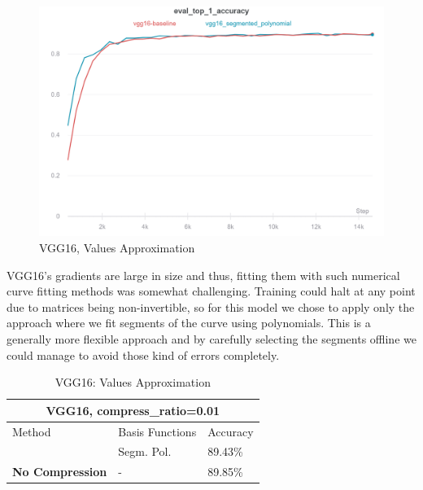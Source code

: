 
    
    \begin{figure}[h]
    \centering
    \includegraphics[width=1\textwidth]{thesis/figures/vgg-values-approx.png}
    \caption{VGG16, Values Approximation}
    \label{vgg_val_approx}
    \end{figure}

    \vspace{2cm}
    \newline
    VGG16's gradients are large in size and thus, fitting them with such numerical curve fitting methods was somewhat challenging.
    Training could halt at any point due to matrices being non-invertible, so for this model we chose to apply only the approach where we fit segments of the curve using polynomials. 
    This is a generally more flexible approach and by carefully selecting the segments offline we could manage to avoid those kind of errors completely.
    
    
    \vspace{1cm}

    \begin{table}[h!]
    \footnotesize
     \centering
    \begin{tabular}{ |p{3cm}||p{3cm}|p{1.5cm}|}
    \hline
    \multicolumn{3}{|c|}{\textbf{\footnotesize VGG16, compress\_ratio=0.01}} \\
    \hline
    \rule{0pt}{3ex}
    	Method & Basis Functions  & Accuracy\\
    \hline
    \rule{0pt}{3ex}
    \multirow{1}{*}{\textbf{Values Approx.}}
    & Segm. Pol. &89.43\%\\
    \hline
    \rule{0pt}{3ex}
    \textbf{No Compression} & - &89.85\%\\
    \hline
    \end{tabular}
    \caption{VGG16: Values Approximation}
    \label{table:6}
    \end{table}
    
